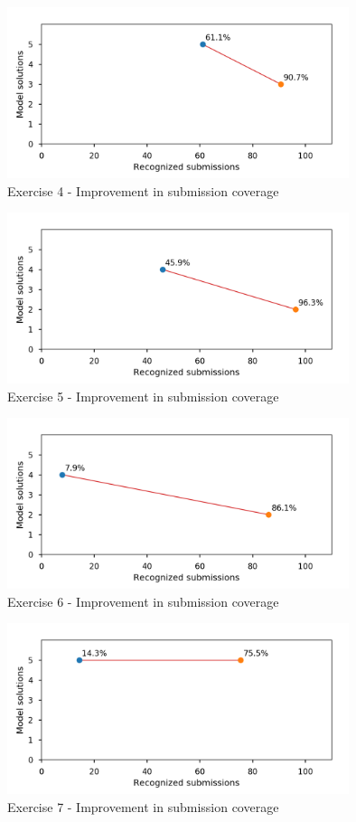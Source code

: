 \begin{figure}
\centering
\includegraphics[height=5cm]{graphs/coverage-4.png}
\caption{Exercise 4 - Improvement in submission coverage}
\label{fig:improvements-coverage-4}
\end{figure}

\begin{figure}
\centering
\includegraphics[height=5cm]{graphs/coverage-5.png}
\caption{Exercise 5 - Improvement in submission coverage}
\label{fig:improvements-coverage-5}
\end{figure}

\begin{figure}
\centering
\includegraphics[height=5cm]{graphs/coverage-6.png}
\caption{Exercise 6 - Improvement in submission coverage}
\label{fig:improvements-coverage-6}
\end{figure}

\begin{figure}
\centering
\includegraphics[height=5cm]{graphs/coverage-7.png}
\caption{Exercise 7 - Improvement in submission coverage}
\label{fig:improvements-coverage-7}
\end{figure}

